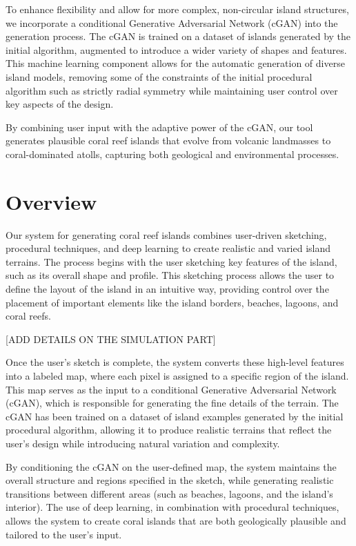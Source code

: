To enhance flexibility and allow for more complex, non-circular island structures, we incorporate a conditional Generative Adversarial Network (cGAN) into the generation process. The cGAN is trained on a dataset of islands generated by the initial algorithm, augmented to introduce a wider variety of shapes and features. This machine learning component allows for the automatic generation of diverse island models, removing some of the constraints of the initial procedural algorithm such as strictly radial symmetry while maintaining user control over key aspects of the design.

By combining user input with the adaptive power of the cGAN, our tool generates plausible coral reef islands that evolve from volcanic landmasses to coral-dominated atolls, capturing both geological and environmental processes.



\section{Overview}
Our system for generating coral reef islands combines user-driven sketching, procedural techniques, and deep learning to create realistic and varied island terrains. The process begins with the user sketching key features of the island, such as its overall shape and profile. This sketching process allows the user to define the layout of the island in an intuitive way, providing control over the placement of important elements like the island borders, beaches, lagoons, and coral reefs.

[ADD DETAILS ON THE SIMULATION PART]

Once the user's sketch is complete, the system converts these high-level features into a labeled map, where each pixel is assigned to a specific region of the island. This map serves as the input to a conditional Generative Adversarial Network (cGAN), which is responsible for generating the fine details of the terrain. The cGAN has been trained on a dataset of island examples generated by the initial procedural algorithm, allowing it to produce realistic terrains that reflect the user's design while introducing natural variation and complexity.

By conditioning the cGAN on the user-defined map, the system maintains the overall structure and regions specified in the sketch, while generating realistic transitions between different areas (such as beaches, lagoons, and the island's interior). The use of deep learning, in combination with procedural techniques, allows the system to create coral islands that are both geologically plausible and tailored to the user's input.

